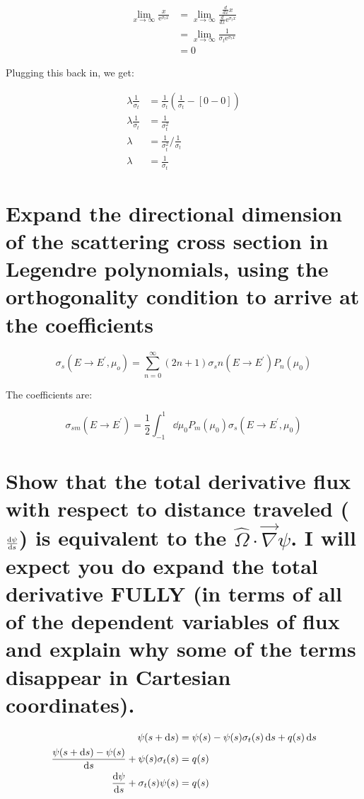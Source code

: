 \documentclass{article}
\begin{document}
\begin{align*}
    \lim_{x\to\infty}\frac{x}{\mathrm{e}^{\sigma_t x}} &= \lim_{x\to\infty}\frac{\frac{d}{dx}x}{\frac{d}{dx}\mathrm{e}^{\sigma_t x}} \\
    &= \lim_{x\to\infty}\frac{1}{\sigma_t \mathrm{e}^{\sigma_t x}} \\
    &= 0
\end{align*}

Plugging this back in, we get:

\begin{align*}
    \lambda \frac{1}{\sigma_t} &= \frac{1}{\sigma_t} \left( \frac{1}{\sigma_t} - \left[ 0 - 0 \right] \right) \\
    \lambda \frac{1}{\sigma_t} &= \frac{1}{\sigma_t^2} \\
    \lambda &= {\frac{1}{\sigma_t^2}} / {\frac{1}{\sigma_t}} \\
    \lambda &= \frac{1}{\sigma_t}
\end{align*}

\newpage
\section{Expand the directional dimension of the scattering cross section in Legendre polynomials, using the orthogonality condition to arrive at the coefficients}

$$
\sigma_s(E \rightarrow E^\prime, \mu_o) = \sum_{n=0}^\infty (2n+1) \sigma_sn(E \rightarrow E^\prime) P_n (\mu_0)
$$

The coefficients are:

$$
\sigma_{sm}(E \rightarrow E^\prime) = \frac{1}{2} \int_{-1}^{1} \dd{\mu_0} P_m(\mu_0) \sigma_s(E\rightarrow E^\prime, \mu_0)
$$

\newpage
\section{Show that the total derivative flux with respect to distance traveled ($\dv{\psi}{s}$) is equivalent to the $\hat{\Omega} \cdot \vec{\nabla} \psi$. I will expect you do expand the total derivative FULLY (in terms of all of the dependent variables of flux and explain why some of the terms disappear in Cartesian coordinates).}

\begin{align}
	\psi(s + \dd{s}) &= \psi(s) - \psi(s) \sigma_t(s) \dd{s} + q(s) \dd{s} \\
	\frac{\psi(s + \dd{s}) - \psi(s)}{\dd{s}} + \psi(s) \sigma_t(s) &= q(s) \\
	\dv{\psi}{s} + \sigma_t(s) \psi(s) &= q(s)
\end{align}
\end{document}

